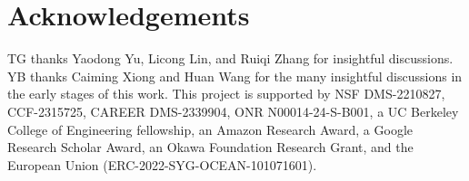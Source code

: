 \section*{Acknowledgements}
TG thanks Yaodong Yu, Licong Lin, and Ruiqi Zhang for insightful discussions.
YB thanks Caiming Xiong and Huan Wang for the many insightful discussions in the early stages of this work.
This project is supported by NSF DMS-2210827, CCF-2315725, CAREER DMS-2339904, ONR N00014-24-S-B001, a UC Berkeley College of Engineering fellowship, an Amazon Research Award, a Google Research Scholar Award, an Okawa Foundation Research Grant, and the European Union (ERC-2022-SYG-OCEAN-101071601). 